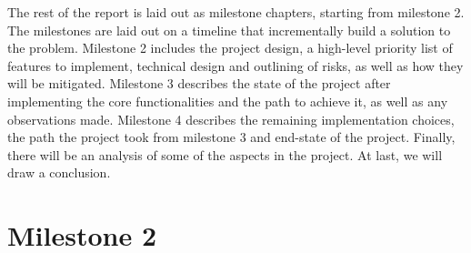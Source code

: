 		The rest of the report is laid out as milestone chapters, starting from milestone 2. The milestones are laid out on a timeline that incrementally build a solution to the problem. Milestone 2 includes the project design, a high-level priority list of features to implement, technical design and outlining of risks, as well as how they will be mitigated. Milestone 3 describes the state of the project after implementing the core functionalities and the path to achieve it, as well as any observations made. Milestone 4 describes the remaining implementation choices, the path the project took from milestone 3 and end-state of the project. Finally, there will be an analysis of some of the aspects in the project. At last, we will draw a conclusion. 		
		

\section{Milestone 2}
